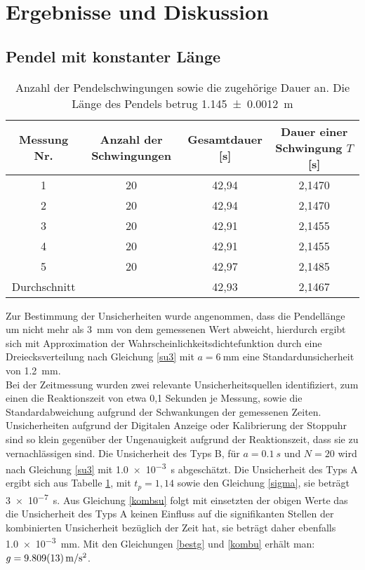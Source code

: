 

\section{Ergebnisse und Diskussion}


\subsection{Pendel mit konstanter Länge}


\begin{table}[h]

\caption{Anzahl der Pendelschwingungen sowie die zugehörige Dauer an. Die Länge des Pendels betrug \SI{1,145+-0,0012} {\m}}

\begin{tabular}{|c||c|c|c|}
\hline
Messung Nr. & Anzahl der Schwingungen & Gesamtdauer [s] & Dauer einer Schwingung $T$ [s] \\ \hline \hline
1&	20&	42,94&	2,1470	\\ \hline
2&	20&	42,94&	2,1470	\\ \hline
3&	20&	42,91&	2,1455	\\ \hline
4&	20&	42,91&	2,1455	\\	\hline
5&	20&	42,97&	2,1485	\\ \hline
Durchschnitt&&42,93&2,1467	\\ \hline


	
\end{tabular}
\label{lkonst}

\end{table}

Zur Bestimmung der Unsicherheiten wurde angenommen, dass die Pendellänge um nicht mehr als \SI{3}{\mm} von dem gemessenen Wert abweicht, hierdurch ergibt sich mit Approximation der Wahrscheinlichkeitsdichtefunktion durch eine Dreiecksverteilung nach Gleichung \ref{su3} mit $a=\SI{6}{\mm}$ eine Standardunsicherheit von \SI{1,2}{mm}. \\


Bei der Zeitmessung wurden zwei relevante Unsicherheitsquellen identifiziert, zum einen die Reaktionszeit von etwa 0,1 Sekunden je Messung, sowie die Standardabweichung aufgrund der Schwankungen der gemessenen Zeiten. Unsicherheiten aufgrund der Digitalen Anzeige oder Kalibrierung der Stoppuhr sind so klein gegenüber der Ungenauigkeit aufgrund der Reaktionszeit, dass sie zu vernachlässigen sind.
 Die Unsicherheit des Typs B, für  $a=\SI{0,1}{s} $ und $N=20$ wird nach Gleichung \ref{su3} mit \SI{1,0e-3}{\s} abgeschätzt. Die Unsicherheit des Typs A ergibt sich aus Tabelle \ref{lkonst}, mit $t_p=1,14$ sowie den Gleichung \ref{sigma}, sie beträgt \SI{3e-7}{s}. Aus Gleichung \ref{kombsu} folgt mit einsetzten der obigen Werte das die Unsicherheit des Typs A keinen Einfluss  auf die signifikanten Stellen der kombinierten Unsicherheit bezüglich der Zeit hat, sie beträgt daher ebenfalls \SI{1,0e-3}{mm}.
Mit den Gleichungen \ref{bestg} und \ref{kombu} erhält man: $g=\SI{9,809+-0,013}{m/s^2}$.





